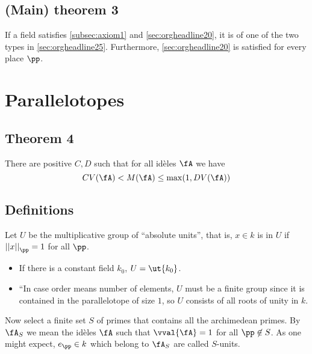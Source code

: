 \subsection{(Main) theorem 3}
\label{sec:orgheadline27}
If a field satisfies \ref{subsec:axiom1} and \ref{sec:orgheadline20}, it is of one of the two types in \ref{sec:orgheadline25}. Furthermore, \ref{sec:orgheadline20} is satisfied for every place $\pp$.

\section{Parallelotopes}
\label{sec:orgheadline31}

\subsection{Theorem 4}
\label{sec:orgheadline29}
There are positive $C, D$ such that for all id\`eles $\fA$ we have
\[ CV(\fA) < M(\fA) \leq \max(1, DV(\fA)) \]


\subsection{Definitions}
\label{sec:orgheadline30}
Let $U$ be the multiplicative group of ``absolute units'', that is, $x\in k$ is in $U$ if ${||x||}_\pp = 1$ for all $\pp$.
\begin{itemize}
\item If there is a constant field $k_0$, $U=\ut {k_0}$.
\item ``In case order means number of elements, $U$ must be a finite group since it is contained in the parallelotope of size $1$, so $U$ consists of all roots of unity in $k$.
\end{itemize}
Now select a finite set $S$ of primes that contains all the archimedean primes. By $\fA_S$ we mean the id\`eles $\fA$ such that $\vval{ \fA } = 1$ for all $\pp\not\in S$. As one might expect, $e_\pp\in k$ which belong to $\fA_S$ are called $S$-units.

